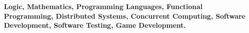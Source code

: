 
\textbf{\small Logic, Mathematics, Programming Languages, 
Functional Programming, Distributed Systems, 
Concurrent Computing,
Software Development, Software Testing, Game Development.}
